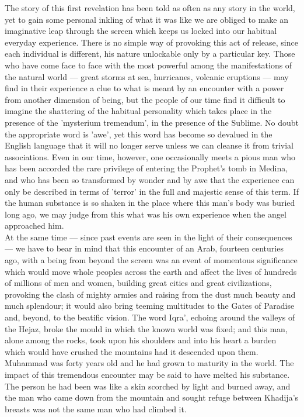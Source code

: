 \documentclass[10pt, twoside]{book}
\begin{document}
The story of this first revelation has been told as often as any story in the world, yet to gain some 
personal inkling of what it was like we are obliged to make an imaginative leap through the screen 
which keeps us locked into our habitual everyday experience. There is no simple way of provoking this 
act of release, since each individual is different, his nature unlockable only by a particular key. 
Those who have come face to face with the most powerful among the manifestations of the natural world 
--- great storms at sea, hurricanes, volcanic eruptions --- may find in their experience a clue to what 
is meant by an encounter with a power from another dimension of being, but the people of our time 
find it difficult to imagine the shattering of the habitual personality which takes place in the 
presence of the 'mysterium tremendum', in the presence of the Sublime. No doubt the appropriate word 
is 'awe', yet this word has become so devalued in the English language that it will no longer serve 
unless we can cleanse it from trivial associations. Even in our time, however, one occasionally meets 
a pious man who has been accorded the rare privilege of entering the Prophet's tomb in Medina, and 
who has been so transformed by wonder and by awe that the experience can only be described in terms 
of 'terror' in the full and majestic sense of this term. If the human substance is so shaken in the 
place where this man's body was buried long ago, we may judge from this what was his own experience 
when the angel approached him. \\

At the same time --- since past events are seen in the light of their consequences --- we have to bear in 
mind that this encounter of an Arab, fourteen centuries ago, with a being from beyond the screen was 
an event of momentous significance which would move whole peoples across the earth and affect the 
lives of hundreds of millions of men and women, building great cities and great civilizations, 
provoking the clash of mighty armies and raising from the dust much beauty and much splendour; it 
would also bring teeming multitudes to the Gates of Paradise and, beyond, to the beatific vision. The 
word Iqra', echoing around the valleys of the Hejaz, broke the mould in which the known world was 
fixed; and this man, alone among the rocks, took upon his shoulders and into his heart a burden which 
would have crushed the mountains had it descended upon them. \\

Muhammad was forty years old and he had grown to maturity in the world. The impact of this tremendous 
encounter may be said to have melted his substance. The person he had been was like a skin scorched 
by light and burned away, and the man who came down from the mountain and sought refuge between 
Khadija's breasts was not the same man who had climbed it. \\
\end{document}
